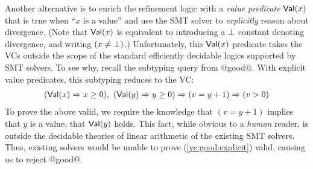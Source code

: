 
%
Another alternative is to enrich the refinement logic
with a \emph{value predicate} $\mathsf{Val}(x)$ that is true when 
``$x$ is a value'' and use the SMT solver to 
\emph{explicitly} reason about divergence.
%
(Note that $\mathsf{Val}(x)$ is equivalent to introducing a 
$\perp$ constant denoting divergence, and 
writing $(x \not =\ \perp)$.)
%
Unfortunately, this $\mathsf{Val}(x)$ predicate takes the VCs 
outside the scope of the standard efficiently decidable logics 
supported by SMT solvers.
%
To see why, recall 
the subtyping query %
from @good@. %
With explicit value predicates, 
this subtyping reduces to the VC:
%
\begin{align}
{(\mathsf{Val}(x) \Rightarrow x \geq 0)}, \
{(\mathsf{Val}(y) \Rightarrow y \geq 0)} 
\Rightarrow
{(v = y+1)}   \Rightarrow {(v > 0)}\label{vc:good:explicit}
\end{align}
%
To prove the above valid, we require the knowledge 
that $(v = y+1)$ implies that $y$ is a value, \ie that 
$\mathsf{Val}(y)$ holds.
%
This fact, while obvious to a \emph{human} reader, is 
outside the decidable theories of linear arithmetic
of the existing SMT solvers.
%
Thus, existing solvers would be unable to prove (\ref{vc:good:explicit}) 
valid, causing us to reject @good@.

